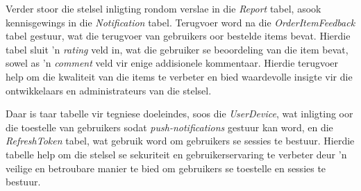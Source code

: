 Verder stoor die stelsel inligting rondom verslae in die \textit{Report} tabel,
asook kennisgewings in die \textit{Notification} tabel. Terugvoer word na die \textit{OrderItemFeedback} tabel gestuur, wat die terugvoer van gebruikers oor
bestelde items bevat. Hierdie tabel sluit 'n \textit{rating} veld in, wat die
gebruiker se beoordeling van die item bevat, sowel as 'n \textit{comment} veld
vir enige addisionele kommentaar. Hierdie terugvoer help om die kwaliteit van
die items te verbeter en bied waardevolle insigte vir die ontwikkelaars en
administrateurs van die stelsel.

Daar is taar tabelle vir tegniese doeleindes, soos die \textit{UserDevice},
wat inligting oor die toestelle van gebruikers sodat \textit{push-notifications}
gestuur kan word, en die \textit{RefreshToken} tabel, wat gebruik word om
gebruikers se sessies te bestuur. Hierdie tabelle help om die stelsel se
sekuriteit en gebruikerservaring te verbeter deur 'n veilige en betroubare
manier te bied om gebruikers se toestelle en sessies te bestuur.

